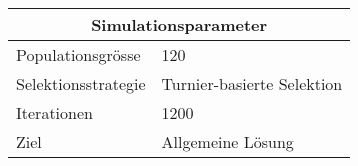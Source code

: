 \begin{center}
    \begin{tabular}{ | l | l | }
      \hline
      \multicolumn{2}{|c|}{Simulationsparameter} \\
      \hline
      Populationsgrösse & 120 \\ \hline
      Selektionsstrategie & Turnier-basierte Selektion \\ \hline
      Iterationen & 1200 \\ \hline
      Ziel & Allgemeine Lösung \\ \hline
      \end{tabular}
\end{center}
